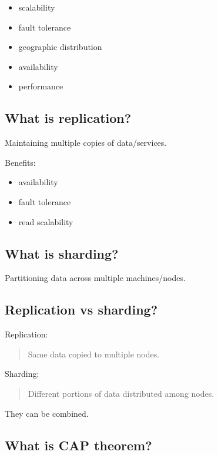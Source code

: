 \begin{itemize}
  \item scalability
  \item fault tolerance
  \item geographic distribution
  \item availability
  \item performance
\end{itemize}

\medskip

\subsection{What is replication?}

Maintaining multiple copies of data/services.

Benefits:

\begin{itemize}
  \item availability
  \item fault tolerance
  \item read scalability
\end{itemize}

\medskip

\subsection{What is sharding?}

Partitioning data across multiple machines/nodes.

\medskip

\subsection{Replication vs sharding?}

Replication:

\begin{quote}
Same data copied to multiple nodes.\\
\end{quote}

Sharding:

\begin{quote}
Different portions of data distributed among nodes.\\
\end{quote}

They can be combined.

\medskip

\subsection{What is CAP theorem?}

